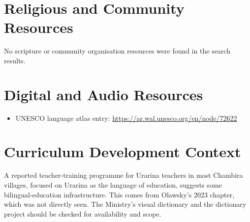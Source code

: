 \documentclass[12pt]{article}
\begin{document}
\section{Religious and Community Resources}
No scripture or community organisation resources were found in the search results.

\section{Digital and Audio Resources}
\begin{itemize}
\item UNESCO language atlas entry: \url{https://ar.wal.unesco.org/en/node/72622}
\end{itemize}

\section{Curriculum Development Context}
A reported teacher-training programme for Urarina teachers in most Chambira villages, focused on Urarina as the language of education, suggests some bilingual-education infrastructure. This comes from Olawsky's 2023 chapter, which was not directly seen. The Ministry's visual dictionary and the dictionary project should be checked for availability and scope.
\end{document}
